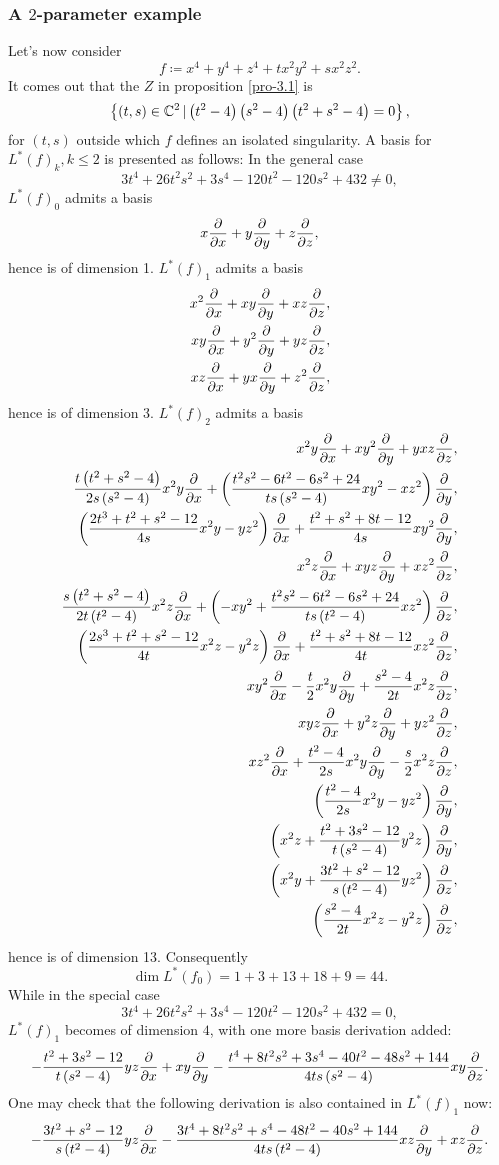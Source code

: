   \subsubsection{A \texorpdfstring{$2$}{2}-parameter example} 
  Let's now consider
  \[f\coloneq  x^4+y^4+z^4+tx^2y^2+sx^2z^2.\]
  It comes out that the $Z$ in proposition \ref{pro-3.1} is 
  \[\left \{(t,s)\in {\mathbb{C}}^2\,| \left( t^2 -4\right) \left(s^2-4\right)\left( t^2+s^2-4\right) =0\right \},\]
  for $(t,s)$ outside which  $f$ defines an isolated singularity. A basis for $L^*(f)_k, k\leqslant 2$ is presented as follows: In the general case 
  \[3t^4+26t^2s^2+3s^4-120t^2-120s^2+432
  \not=0,\]
  $L^*(f)_0$ admits a basis 
  \[ x\frac{\partial }{\partial x}+y\frac{\partial }{\partial y}+z\frac{\partial }{\partial z},\]
  hence is of dimension 1.
  $L^*(f)_1$ admits a basis 
  \begin{align*} 
    x^2\frac{\partial }{\partial x}+xy\frac{\partial }{\partial y}+xz\frac{\partial }{\partial z},\\
    xy\frac{\partial }{\partial x}+y^2\frac{\partial }{\partial y}+yz\frac{\partial }{\partial z},\\
    xz\frac{\partial }{\partial x}+yx\frac{\partial }{\partial y}+z^2\frac{\partial }{\partial z},
  \end{align*}
  hence is of dimension 3.
  $L^*(f)_2$ admits a basis 
  \begin{align*}
    x^2y\frac{\partial }{\partial x}+xy^2\frac{\partial }{\partial y}+yxz\frac{\partial }{\partial z},\\
    \frac{t\left(t^2+s^2-4\right)}{2s\left(s^2-4\right)}x^2y\frac{\partial }{\partial x}+\left(\frac{t^2s^2-6t^2-6s^2+24}{ts\left(s^2-4\right)}xy^2-xz^2\right)\frac{\partial }{\partial y},\\
    \left(\frac{2t^3+t^2+s^2-12}{4s}x^2y-yz^2\right)\frac{\partial }{\partial x}+\frac{t^2+s^2+8t-12}{4s}xy^2\frac{\partial }{\partial y},\\
    x^2z\frac{\partial }{\partial x}+xyz\frac{\partial }{\partial y}+xz^2\frac{\partial }{\partial z},\\
    \frac{s\left(t^2+s^2-4\right)}{2t\left(t^2-4\right)}x^2z\frac{\partial }{\partial x}
    +\left(-xy^2+\frac{t^2s^2-6t^2-6s^2+24}
    {ts\left(t^2-4\right)}xz^2\right)\frac{\partial }{\partial z},\\
    \left(\frac{2s^3+t^2+s^2-12}{4t}x^2z-y^2z\right)\frac{\partial }{\partial x}
    +\frac{t^2+s^2+8t-12}{4t}xz^2\frac{\partial }{\partial z},\\
    xy^2\frac{\partial }{\partial x}-\frac t 2 x^2y\frac{\partial }{\partial y}+\frac{s^2-4}{2t} x^2z\frac{\partial }{\partial z},\\
    xyz\frac{\partial }{\partial x}+y^2z\frac{\partial }{\partial y}+yz^2\frac{\partial }{\partial z},\\
    xz^2\frac{\partial }{\partial x}+\frac{t^2-4}{2s}x^2y\frac{\partial }{\partial y}-\frac s 2 x^2 z \frac{\partial }{\partial z},\\
    \left(\frac{t^2-4}{2s}x^2y-yz^2\right)\frac{\partial }{\partial y},\\
    \left(x^2z+\frac{t^2+3s^2-12}{t\left(s^2-4\right)}y^2z\right)\frac{\partial }{\partial y},\\
    \left(x^2y+\frac{3t^2+s^2-12}{s\left(t^2-4\right)}yz^2\right)\frac{\partial }{\partial z},\\
    \left(\frac{s^2-4}{2t}x^2z-y^2z\right)\frac{\partial }{\partial z},
  \end{align*}
  hence is of dimension 13. Consequently
  \[\dim L^*(f_0) = 1+3+13+18+9=44.\]
  While in the special case
  \[3t^4+26t^2s^2+3s^4-120t^2-120s^2+432
  =0,\]
  $L^*(f)_1$ becomes of dimension $4$, with one more basis derivation added:
  \[-\frac{t^2+3s^2-12}{t\left(s^2-4\right)} yz \frac{\partial }{\partial x} 
    +xy\frac{\partial }{\partial y}
  -\frac{t^4+8t^2s^2+3s^4 -40t^2-48s^2+144} {4ts\left(s^2-4\right)} xy \frac{\partial }{\partial z}.\]
  One may check that the following derivation is also contained in $L^*(f)_1$ now:	
  \[-\frac{3t^2+s^2-12}{s\left(t^2-4\right)} yz \frac{\partial }{\partial x} 
    -\frac{3t^4+8t^2s^2+s^4-48t^2 -40s^2+144} {4ts\left(t^2-4\right)} xz \frac{\partial }{\partial y}
  +xz\frac{\partial }{\partial z}.\]


